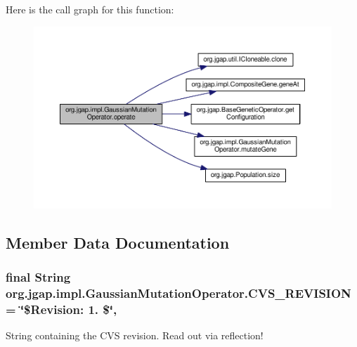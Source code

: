 Here is the call graph for this function\-:
\nopagebreak
\begin{figure}[H]
\begin{center}
\leavevmode
\includegraphics[width=350pt]{classorg_1_1jgap_1_1impl_1_1_gaussian_mutation_operator_aa33da8cc4da351383f79ddaae90e988a_cgraph}
\end{center}
\end{figure}




\subsection{Member Data Documentation}
\hypertarget{classorg_1_1jgap_1_1impl_1_1_gaussian_mutation_operator_afb314b840f00bec5fc37ff2457c0c9ee}{
\subsubsection[{C\-V\-S\-\_\-\-R\-E\-V\-I\-S\-I\-O\-N}]{\setlength{\rightskip}{0pt plus 5cm}final String org.\-jgap.\-impl.\-Gaussian\-Mutation\-Operator.\-C\-V\-S\-\_\-\-R\-E\-V\-I\-S\-I\-O\-N = \char`\"{}\$Revision\-: 1. \$\char`\"{}\hspace{0.3cm}{\ttfamily [static]}, {\ttfamily [private]}}}\label{classorg_1_1jgap_1_1impl_1_1_gaussian_mutation_operator_afb314b840f00bec5fc37ff2457c0c9ee}
String containing the C\-V\-S revision. Read out via reflection! 

